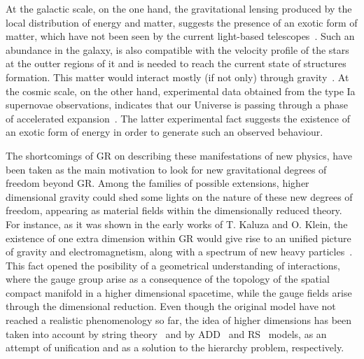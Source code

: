 \documentclass[aps,prd,12pt,superscriptaddress,showpacs,showkeys,longbibliography,reprint,nofootinbib]{revtex4-1}
\begin{document}
At the galactic scale, on the one hand, the gravitational lensing produced by the local distribution of energy and matter, suggests the presence of an exotic form of matter, which have not been seen by the current light-based telescopes~\cite{Sofue:2000jx}. Such an abundance in the galaxy, is also compatible with the velocity profile of the stars at the outter regions of it and is needed to reach the current state of structures formation. This matter would interact mostly (if not only) through gravity~\cite{Sofue:2000jx}. At the cosmic scale, on the other hand, experimental data obtained from the type Ia supernovae observations, indicates that our Universe is passing through a phase of accelerated expansion~\cite{Riess:1998cb}. The latter experimental fact suggests the existence of an exotic form of energy in order to generate such an observed behaviour. 

The shortcomings of GR on describing these manifestations of new physics, have been taken as the main motivation to look for new gravitational degrees of freedom beyond GR. Among the families of possible extensions, higher dimensional gravity could shed some lights on the nature of these new degrees of freedom, appearing as material fields within the dimensionally reduced theory. For instance, as it was shown in the early works of T. Kaluza and O. Klein, the existence of one extra dimension within GR would give rise to an unified picture of gravity and electromagnetism, along with a spectrum of new heavy particles~\cite{Kaluza:1921tu,*Klein:1926tv}. This fact opened the posibility of a geometrical understanding of interactions, where the gauge group arise as a consequence of the topology of the spatial compact manifold in a higher dimensional spacetime, while the gauge fields arise through the dimensional reduction. Even though the original model have not reached a realistic phenomenology so far, the idea of higher dimensions has been taken into account by string theory~\cite{Green:1987sp,*Green:1987mn} and by ADD~\cite{ArkaniHamed:1998rs,*Antoniadis:1998ig} and RS~\cite{Randall:1999ee,*Randall:1999vf} models, as an attempt of unification and as a solution to the hierarchy problem, respectively.
\end{document}
